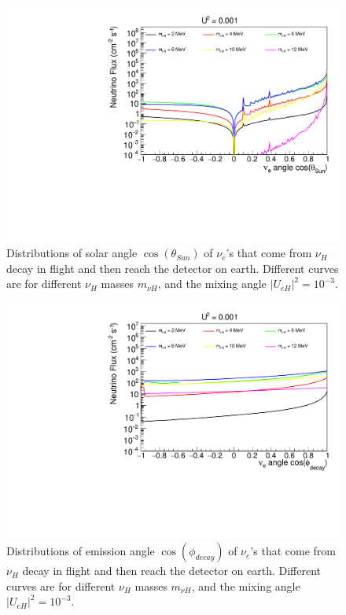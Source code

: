 \documentclass[%
 reprint,
 amsmath,amssymb,
 aps,
 prd,
floatfix,
twocolumn,
]{revtex4-1}
\begin{document}
\begin{figure}[!htbp]
\includegraphics[width=0.99\columnwidth]{../plots/DecayInFlightNuLCosthetaSun_U0.001_AllMass_linXlogY.pdf}
\caption{Distributions of solar angle $\cos(\theta_{Sun})$ of $\nu_e$'s that come from $\nu_H$ decay in flight and then reach the detector on earth. Different curves are for different $\nu_H$ masses $m_{\nu H}$, and the mixing angle $|U_{eH}|^2 = 10^{-3}$.}
\label{fig:DecayInFlightTheta_U1em3_AllMass}
\end{figure}

\begin{figure}[!htbp]
\includegraphics[width=0.99\columnwidth]{../plots/DecayInFlightNuLCosphiSun_U0.001_AllMass_linXlogY.pdf}
\caption{Distributions of emission angle $\cos(\phi_{decay})$ of $\nu_e$'s that come from $\nu_H$ decay in flight and then reach the detector on earth. Different curves are for different $\nu_H$ masses $m_{\nu H}$, and the mixing angle $|U_{eH}|^2 = 10^{-3}$.}
\label{fig:DecayInFlightPhi_U1em3_AllMass}
\end{figure}
\end{document}
